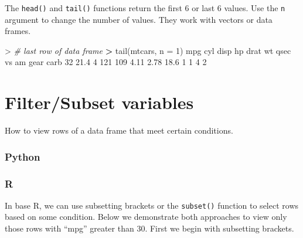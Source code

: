 \documentclass[
]{book}
\newenvironment{Shaded}{\begin{snugshade}}{\end{snugshade}}
\newcommand{\AttributeTok}[1]{\textcolor[rgb]{0.77,0.63,0.00}{#1}}
\newcommand{\CommentTok}[1]{\textcolor[rgb]{0.56,0.35,0.01}{\textit{#1}}}
\newcommand{\DecValTok}[1]{\textcolor[rgb]{0.00,0.00,0.81}{#1}}
\newcommand{\ErrorTok}[1]{\textcolor[rgb]{0.64,0.00,0.00}{\textbf{#1}}}
\newcommand{\FloatTok}[1]{\textcolor[rgb]{0.00,0.00,0.81}{#1}}
\newcommand{\FunctionTok}[1]{\textcolor[rgb]{0.00,0.00,0.00}{#1}}
\newcommand{\NormalTok}[1]{#1}
\newcommand{\SpecialCharTok}[1]{\textcolor[rgb]{0.00,0.00,0.00}{#1}}
\begin{document}
The \texttt{head()} and \texttt{tail()} functions return the first 6 or last 6 values. Use the \texttt{n} argument to change the number of values. They work with vectors or data frames.

\begin{Shaded}
\end{Shaded}

\begin{Shaded}
\begin{Highlighting}[]
\SpecialCharTok{\textgreater{}} \CommentTok{\# last row of data frame}
\ErrorTok{\textgreater{}} \FunctionTok{tail}\NormalTok{(mtcars, }\AttributeTok{n =} \DecValTok{1}\NormalTok{)}
\NormalTok{    mpg cyl disp  hp drat   wt qsec vs am gear carb}
\DecValTok{32} \FloatTok{21.4}   \DecValTok{4}  \DecValTok{121} \DecValTok{109} \FloatTok{4.11} \FloatTok{2.78} \FloatTok{18.6}  \DecValTok{1}  \DecValTok{1}    \DecValTok{4}    \DecValTok{2}
\end{Highlighting}
\end{Shaded}

\hypertarget{filtersubset-variables}{%
\section{Filter/Subset variables}\label{filtersubset-variables}}

How to view rows of a data frame that meet certain conditions.

\hypertarget{python-19}{%
\subsubsection*{Python}\label{python-19}}

\hypertarget{r-19}{%
\subsubsection*{R}\label{r-19}}

In base R, we can use subsetting brackets or the \texttt{subset()} function to select rows based on some condition. Below we demonstrate both approaches to view only those rows with ``mpg'' greater than 30. First we begin with subsetting brackets.
\end{document}
